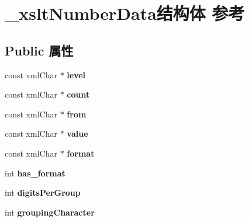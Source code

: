 \hypertarget{struct__xslt_number_data}{}\section{\+\_\+xslt\+Number\+Data结构体 参考}
\label{struct__xslt_number_data}
\subsection*{Public 属性}
\begin{DoxyCompactItemize}
\item 
\mbox{\label{struct__xslt_number_data_ac997049f2cdb92bc79f29b96a0cd63ba}} 
const xml\+Char $\ast$ {\bfseries level}
\item 
\mbox{\label{struct__xslt_number_data_a790685c8cb9abb9769408c9ec7ef4270}} 
const xml\+Char $\ast$ {\bfseries count}
\item 
\mbox{\label{struct__xslt_number_data_a1aa95def2369f66a088019353e6e1138}} 
const xml\+Char $\ast$ {\bfseries from}
\item 
\mbox{\label{struct__xslt_number_data_a3cbced3fa99aeb415c3a21c0a2063596}} 
const xml\+Char $\ast$ {\bfseries value}
\item 
\mbox{\label{struct__xslt_number_data_a316f3ebff5ee852ef98b49607877943a}} 
const xml\+Char $\ast$ {\bfseries format}
\item 
\mbox{\label{struct__xslt_number_data_a809af13a118664ddb99d54a8039aef49}} 
int {\bfseries has\+\_\+format}
\item 
\mbox{\label{struct__xslt_number_data_aaf479d79fa0e305db94bc0d5db68d1d5}} 
int {\bfseries digits\+Per\+Group}
\item 
\mbox{\label{struct__xslt_number_data_a3eafd9afa45b7209017d8e87ed185c4f}} 
int {\bfseries grouping\+Character}
\item 
\mbox{\label{struct__xslt_number_data_a6a55344d7d9465395f74bbd4eda1122d}} 

\end{DoxyCompactItemize}
